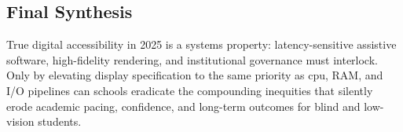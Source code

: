 \subsection*{Final Synthesis}

True digital accessibility in 2025 is a systems property: latency-sensitive assistive software, high-fidelity rendering, and institutional governance must interlock. Only by elevating display specification to the same priority as \gls{cpu}, RAM, and I/O pipelines can schools eradicate the compounding inequities that silently erode academic pacing, confidence, and long-term outcomes for blind and low-vision students.
